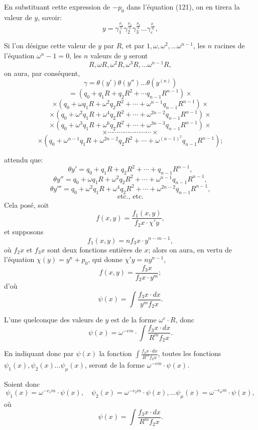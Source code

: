 \documentclass{article}
\begin{document}
En substituant cette expression de $-p_0$ dans l'équation (121), on en tirera la valeur de $y$, savoir:
\[ y = \gamma_1^{\frac{\mu_1}{n}}\gamma_2^{\frac{\mu_2}{n}}\gamma_3^{\frac{\mu_3}{n}} \ldots \gamma_\varepsilon^{\frac{\mu_\varepsilon}{n}}, \tag{123} \]

Si l'on désigne cette valeur de $y$ par $R$, et par $1, \omega, \omega^{2}, \ldots \omega^{n-1}$, les $n$ racines de l'équation $\omega^{n}-1=0$, les $n$ valeurs de $y$ seront
\[ R, \omega R, \omega^{2}R, \omega^{3}R, \ldots \omega^{n-1}R, \tag{124} \]
on aura, par conséquent,
\[ \gamma = \theta(y')\theta(y'') \ldots \theta(y^{(n)}) \]
\[ = (q_0+q_1 R+q_2 R^{2}+\cdots q_{n-1}R^{n-1}) \times \]
\[ \times (q_0+\omega q_1 R+\omega^{2}q_2 R^{2}+\cdots+\omega^{n-1}q_{n-1}R^{n-1}) \times \]
\[ \times (q_0+\omega^{2}q_1 R+\omega^{4}q_2 R^{2}+\cdots+\omega^{2n-2}q_{n-1}R^{n-1}) \times \]
\[ \times (q_0+\omega^{3}q_1 R+\omega^{6}q_2 R^{2}+\cdots+\omega^{3n-3}q_{n-1}R^{n-1}) \times \]
\[ \times \cdots\cdots\cdots\cdots\cdots\cdots\cdots\cdots \times \]
\[ \times (q_0+\omega^{n-1}q_1 R+\omega^{2n-2}q_2 R^{2}+\cdots+\omega^{(n-1)^2}q_{n-1}R^{n-1}); \tag{125} \]

attendu que:
\[ \theta y' = q_0+q_1 R+q_2 R^{2}+\cdots+q_{n-1}R^{n-1}, \]
\[ \theta y'' = q_0+\omega q_1 R+\omega^{2}q_2 R^{2}+\cdots+\omega^{n-1}q_{n-1}R^{n-1}, \]
\[ \theta y''' = q_0+\omega^{2}q_1 R+\omega^{4}q_2 R^{2}+\cdots+\omega^{2n-2}q_{n-1}R^{n-1}, \]
\[ \text{etc., etc.} \tag{126} \]
Cela posé, soit
\[ f(x, y) = \frac{f_1(x, y)}{f_2 x \cdot \chi' y}, \tag{127} \]
et supposons
\[ f_1(x, y) = n f_3 x \cdot y^{n-m-1}, \]
où $f_2 x$ et $f_3 x$ sont deux fonctions entières de $x$; alors on aura, en vertu de l'équation $\chi(y) = y^{n}+p_0$, qui donne $\chi' y = n y^{n-1}$,
\[ f(x, y) = \frac{f_3 x}{f_2 x \cdot y^{m}}; \tag{128} \]
d'où
\[ \psi(x) = \int \frac{f_3 x \cdot dx}{y^{m} f_2 x}. \tag{129} \]

L'une quelconque des valeurs de $y$ est de la forme $\omega^{e} \cdot R$, donc
\[ \psi(x) = \omega^{-em} \cdot \int \frac{f_3 x \cdot dx}{R^{m} f_2 x}. \tag{130} \]

En indiquant donc par $\psi(x)$ la fonction $\displaystyle\int \frac{f_3 x \cdot dx}{R^{m} f_2 x}$, toutes les fonctions $\psi_1(x), \psi_2(x) \ldots \psi_\mu(x)$, seront de la forme $\omega^{-em} \cdot \psi(x)$.

Soient donc
\[ \psi_1(x) = \omega^{-e_1 m} \cdot \psi(x), \quad \psi_2(x) = \omega^{-e_2 m} \cdot \psi(x), \ldots \psi_\mu(x) = \omega^{-e_\mu m} \cdot \psi(x), \tag{131} \]
où
\[ \psi(x) = \int \frac{f_3 x \cdot dx}{R^{m} f_2 x}. \]
\end{document}
